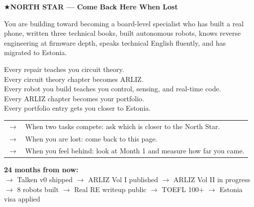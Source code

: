 \begin{northstarbox}
\textbf{\color{arlizblue}\large $\bigstar$\enspace NORTH STAR --- Come Back Here When Lost}

\vspace{6pt}
You are building toward becoming a board-level specialist who has built a real phone,
written three technical books, built autonomous robots, knows reverse engineering at
firmware depth, speaks technical English fluently, and has migrated to Estonia.

\vspace{6pt}
Every repair teaches you circuit theory.\\
Every circuit theory chapter becomes ARLIZ.\\
Every robot you build teaches you control, sensing, and real-time code.\\
Every ARLIZ chapter becomes your portfolio.\\
Every portfolio entry gets you closer to Estonia.

\vspace{6pt}
\begin{tabular}{@{\hspace{4pt}}ll}
  \textbf{\color{arlizblue}$\to$} & When two tasks compete: ask which is closer to the North Star. \\
  \textbf{\color{arlizblue}$\to$} & When you are lost: come back to this page. \\
  \textbf{\color{arlizblue}$\to$} & When you feel behind: look at Month 1 and measure how far you came. \\
\end{tabular}

\vspace{6pt}
\textbf{\color{arlizgold}24 months from now:}\\
\hspace{4pt}$\to$ Talken v0 shipped\qquad
$\to$ ARLIZ Vol I published\qquad
$\to$ ARLIZ Vol II in progress\\
\hspace{4pt}$\to$ 8 robots built\qquad
$\to$ Real RE writeup public\qquad
$\to$ TOEFL 100+\qquad
$\to$ Estonia visa applied
\end{northstarbox}